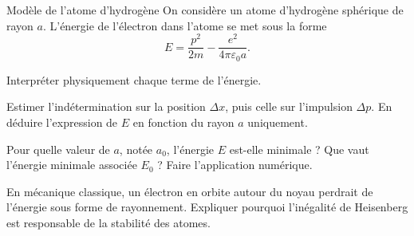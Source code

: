 \begin{exo}[PC]{Modèle de l'atome d'hydrogène}
On considère un atome d'hydrogène sphérique de rayon $a$. L'énergie de l'électron dans l'atome se met sous la forme
\begin{equation*}
E= \frac{p^2}{2m}-\frac{e^2}{4\pi\varepsilon_0 a}.
\end{equation*}
\begin{quest}
\item Interpréter physiquement chaque terme de l'énergie.
\item Estimer l’indétermination sur la position $\Delta x$, puis celle sur l’impulsion $\Delta p$. En déduire l’expression de $E$ en fonction du rayon $a$ uniquement.

\item Pour quelle valeur de $a$, notée $a_{0}$, l’énergie $E$ est-elle minimale ? Que vaut  l’énergie minimale associée $E_0$ ? Faire l'application numérique.
\item
En mécanique classique, un électron en orbite autour du noyau perdrait de l’énergie sous forme de rayonnement.
 Expliquer pourquoi l'inégalité de Heisenberg est responsable de la stabilité des atomes.
\end{quest}
\end{exo}

